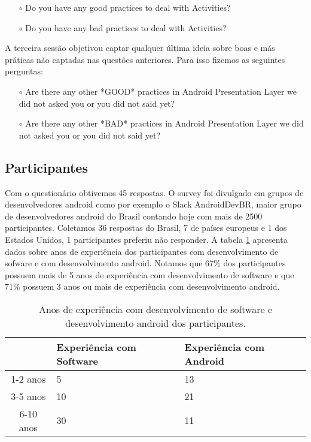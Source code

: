 \begin{itemize} 
	\item[$\circ$] Do you have any good practices to deal with Activities?
	\item[$\circ$] Do you have any bad practices to deal with Activities? 
\end{itemize}

A terceira sess\~ao objetivou captar qualquer \'ultima ideia sobre boas e m\'as pr\'aticas n\~ao captadas nas quest\~oes anteriores. Para isso fizemos as seguintes perguntas: \\

\begin{itemize} 
	\item[$\circ$] Are there any other *GOOD* practices in Android Presentation Layer we did not asked you or you did not said yet?
	\item[$\circ$] Are there any other *BAD* practices in Android Presentation Layer we did not asked you or you did not said yet?
\end{itemize}


\subsection{Participantes}

Com o question\'ario obtivemos 45 respostas. O survey foi divulgado em grupos de desenvolvedores android como por exemplo o Slack AndroidDevBR, maior grupo de desenvolvedores android do Brasil contando hoje com mais de 2500 participantes. Coletamos 36 respostas do Brasil, 7 de pa\'ises europeus e 1 dos Estados Unidos, 1 participantes preferiu n\~ao responder. A tabela \ref{tab:DadosDemograficos} apresenta dados sobre anos de experi\^encia dos participantes com desenvolvimento de sofware e com desenvolvimento android. Notamos que 67\% dos participantes possuem mais de 5 anos de experi\^encia com desenvolvimento de software e que 71\% possuem 3 anos ou mais de experi\^encia com desenvolvimento android.

\begin{table}[h]
\centering
\caption{Anos de experi\^encia com desenvolvimento de software e desenvolvimento android dos participantes.}
\begin{tabular}{c|p{2cm}p{2cm}}
& Experi\^encia com Software & Experi\^encia com Android \\
\hline
1-2 anos &	5  &	13 \\
3-5 anos &	10 &	21 \\
6-10 anos &	30 &	11 \\
\end{tabular}
\label{tab:DadosDemograficos}
\end{table}


